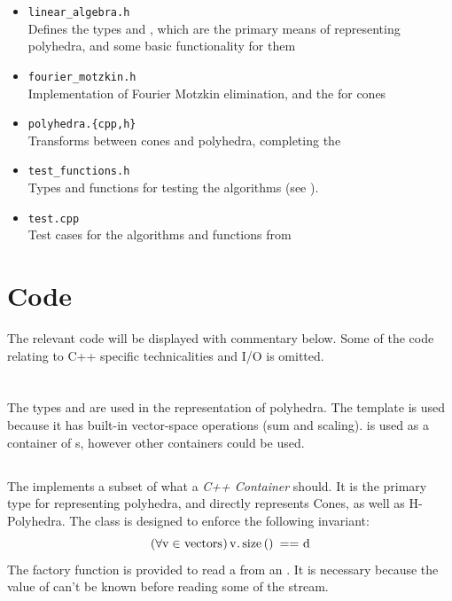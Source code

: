 \begin{itemize}
	\item \texttt{linear\_algebra.h} \\
	      Defines the types  and , which are the primary means of representing polyhedra, and some basic functionality for them
	\item \texttt{fourier\_motzkin.h} \\
	      Implementation of Fourier Motzkin elimination, and the {\MWT} for cones
	\item \texttt{polyhedra.\{cpp,h\} } \\
	      Transforms between cones and polyhedra, completing the {\MWT}
	\item \texttt{test\_functions.h} \\
	      Types and functions for testing the algorithms (see ).
	\item \texttt{test.cpp} \\
	      Test cases for the algorithms and functions from 
\end{itemize}

\section{Code}

The relevant code will be displayed with commentary below.  Some of the code relating to C{++} specific technicalities and I/O is omitted.

\section{}
\subsection{}
The types  and  are used in the representation of polyhedra.  The  template is used because it has built-in vector-space operations (sum and scaling).   is used as a container of s, however other containers could be used.
\lsttdVecs

\subsection{}
The  implements a subset of what a \textit{C++ Container} should.  It is the primary type for representing polyhedra, and directly represents Cones, as well as H-Polyhedra.  The class is designed to enforce the following invariant:
\[ (\forall \mli{v} \in \mli{vectors})\, \mli{v.size() == d} \]
The factory function  is provided to read a  from an .  It is necessary because the value of  can't be known before reading some of the stream.
\lstMatrix

